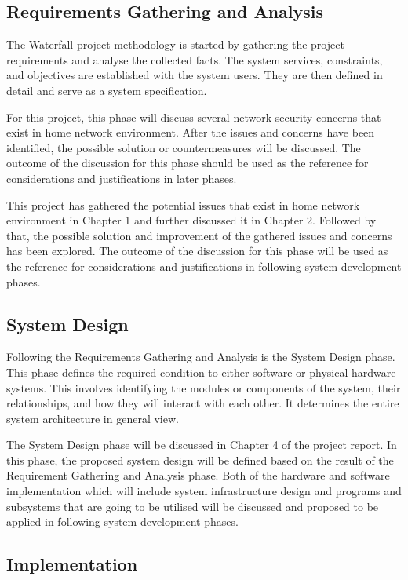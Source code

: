 \documentclass[../index.tex]{subfiles}
\begin{document}
\subsection{Requirements Gathering and Analysis}

The Waterfall project methodology is started by gathering the project requirements and analyse the
collected facts. The system services, constraints, and objectives are established with the system
users. They are then defined in detail and serve as a system specification.

For this project, this phase will discuss several network security concerns that exist in home
network environment. After the issues and concerns have been identified, the possible solution or
countermeasures will be discussed. The outcome of the discussion for this phase should be used as
the reference for considerations and justifications in later phases.

This project has gathered the potential issues that exist in home network environment in Chapter 1
and further discussed it in Chapter 2. Followed by that, the possible solution and improvement of
the gathered issues and concerns has been explored. The outcome of the discussion for this phase
will be used as the reference for considerations and justifications in following system development
phases.

\subsection{System Design}

Following the Requirements Gathering and Analysis is the System Design phase. This phase defines the
required condition to either software or physical hardware systems.  This involves identifying the
modules or components of the system, their relationships, and how they will interact with each
other. It determines the entire system architecture in general view.

The System Design phase will be discussed in Chapter 4 of the project report. In this phase, the
proposed system design will be defined based on the result of the Requirement Gathering and Analysis
phase. Both of the hardware and software implementation which will include system infrastructure
design and programs and subsystems that are going to be utilised will be discussed and proposed to
be applied in following system development phases.

\subsection{Implementation}
\end{document}
